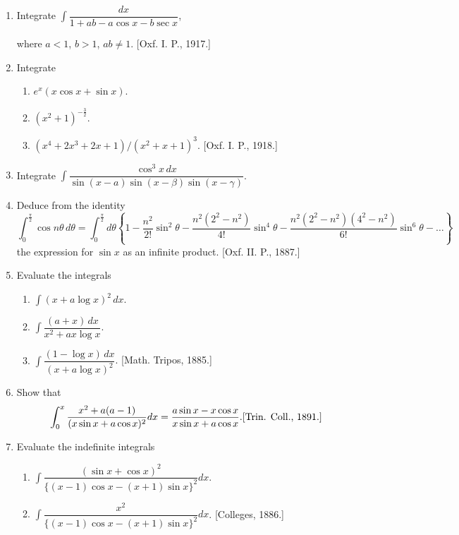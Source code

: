 \documentclass[11pt, a4paper]{article}
\newcommand{\source}[1]{\hfill\textnormal{[#1]}}
\begin{document}
\begin{enumerate}[leftmargin=2em]
Deduce from (1) and (2) that
\[
\tan^{-1}\sqrt{\dfrac{a+1}{a-1}\cdot\dfrac{1-\sin x}{1+\sin x}}+\tan^{-1}\dfrac{a\tan\dfrac x2-1}{\sqrt{a^2-1}}
\]
is independent of $x$, and verify your conclusion. \source{C. S., 1898.}

\item Integrate $\displaystyle\int \dfrac{dx}{1+ab-a\cos x-b\sec x}$,

where $a<1$, $b>1$, $ab\neq1$. \source{Oxf. I. P., 1917.}

\item Integrate
\begin{enumerate}[label=(\roman*)]
\item $e^x(x\cos x+\sin x)$.
\item $(x^2+1)^{-\frac32}$.
\item $(x^4+2x^3+2x+1)/(x^2+x+1)^3$. \source{Oxf. I. P., 1918.}
\end{enumerate}

\item Integrate $\displaystyle\int \dfrac{\cos^3x\,dx}{\sin(x-a)\sin(x-\beta)\sin(x-\gamma)}$.

\item Deduce from the identity
\[
\int_0^{\frac\pi2}\cos n\theta\,d\theta = \int_0^{\frac\pi2}d\theta\left\{1-\dfrac{n^2}{2!}\sin^2\theta-\dfrac{n^2(2^2-n^2)}{4!}\sin^4\theta-\dfrac{n^2(2^2-n^2)(4^2-n^2)}{6!}\sin^6\theta-\dots\right\}
\]
the expression for $\sin x$ as an infinite product. \source{Oxf. II. P., 1887.}

\item Evaluate the integrals
\begin{enumerate}[label=(\roman*)]
\item $\displaystyle\int (x+a\log x)^2\,dx$.
\item $\displaystyle\int \dfrac{(a+x)\,dx}{x^2+ax\log x}$.
\item $\displaystyle\int \dfrac{(1-\log x)\,dx}{(x+a\log x)^2}$. \source{Math. Tripos, 1885.}
\end{enumerate}

\item Show that
\[
\int_0^x \dfrac{x^2+a(a-1)}{(x\sin x+a\cos x)^2}dx = \dfrac{a\sin x-x\cos x}{x\sin x+a\cos x}. \source{Trin. Coll., 1891.}
\]

\item Evaluate the indefinite integrals
\begin{enumerate}[label=(\roman*)]
\item $\displaystyle\int \dfrac{(\sin x+\cos x)^2}{\{(x-1)\cos x-(x+1)\sin x\}^2}dx$.
\item $\displaystyle\int \dfrac{x^2}{\{(x-1)\cos x-(x+1)\sin x\}^2}dx$. \source{Colleges, 1886.}
\end{enumerate}


\end{enumerate}
\end{document}

